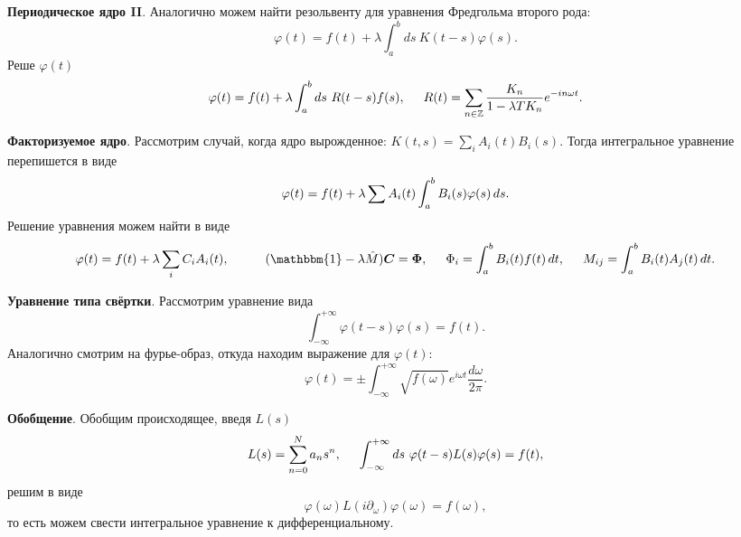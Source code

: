 \textbf{Периодическое ядро II}. Аналогично можем найти резольвенту для уравнения Фредгольма второго рода:
\begin{equation*}
	\varphi(t) = f(t) +  \lambda \int_{a}^{b} ds\ K(t-s) \varphi(s).
\end{equation*}
Реше $\varphi(t)$
\begin{equation}
	\varphi(t) = f(t) + \lambda \int_{a}^{b} ds\ R(t-s) f(s),
	\hspace{5 mm} 
	R(t) = \sum_{n \in \mathbb{Z}} \frac{K_n}{1-\lambda T K_n} e^{-i n \omega t}.
\end{equation}


\textbf{Факторизуемое ядро}. Рассмотрим случай, когда ядро вырожденное: $K(t, s) = \sum_i A_i (t) B_i (s)$.  Тогда интегральное уравнение перепишется в виде
\begin{equation*}
	\varphi(t) = f(t) + \lambda  \sum A_i(t)  \int_{a}^{b} B_i (s) \varphi(s) \, d s.
\end{equation*}
Решение уравнения можем найти в виде
\begin{equation*}
	\varphi(t) = f(t) + \lambda \sum_i C_i A_i (t),
	\hspace{10 mm} 
	(\mathbbm{1} - \lambda \hat{M}) \vc{C} = \vc{\Phi},
	\hspace{5 mm} 
	\Phi_i = \int_{a}^{b} B_i (t) f(t) \d t,
	\hspace{5 mm} 
	M_{ij} = \int_{a}^{b} B_i(t) A_j(t) \d t.
\end{equation*}



\textbf{Уравнение типа свёртки}. Рассмотрим уравнение вида
\begin{equation}
	\int_{-\infty}^{+\infty} \varphi(t-s) \varphi(s) = f(t).
\end{equation}
Аналогично смотрим на фурье-образ, откуда находим выражение для $\varphi(t)$:
\begin{equation}
	\varphi(t) = \pm \int_{-\infty}^{+\infty} \sqrt{f(\omega)} e^{i \omega t} \frac{d \omega}{2\pi}.
\end{equation}

\textbf{Обобщение}. 
Обобщим происходящее, введя $L(s)$
\begin{equation}
	L(s) = \sum_{n=0}^{N} a_n s^n,
	\hspace{5 mm} 
\int_{-\infty}^{+\infty} ds\ \varphi(t-s) L(s) \varphi(s) = f(t),
\end{equation}
решим в виде
\begin{equation}
	\varphi(\omega) L(i \partial_\omega) \varphi(\omega) = f(\omega),
\end{equation}
то есть можем свести интегральное уравнение к дифференциальному.


